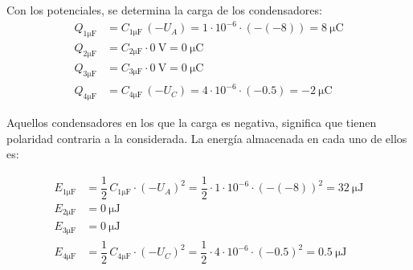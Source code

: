 \vspace{4mm}
Con los potenciales, se determina la carga de los condensadores:
\begin{align*}
  Q_{1\si{\micro\farad}}&=C_{1\si{\micro\farad}}\, (-U_{A}) = 1\cdot 10^{-6}\cdot (-(-8))= \boxed{\qty{8}{\micro\coulomb}}\\
  Q_{2\si{\micro\farad}}&=C_{2\si{\micro\farad}} \cdot \qty{0}{\volt} = \boxed{\qty{0}{\micro\coulomb}}\\
  Q_{3\si{\micro\farad}}&=C_{3\si{\micro\farad}} \cdot \qty{0}{\volt} = \boxed{\qty{0}{\micro\coulomb}}\\
  Q_{4\si{\micro\farad}}&=C_{4\si{\micro\farad}}\, (-U_C) = 4\cdot 10^{-6}\cdot (-0.5)= \boxed{\qty{-2}{\micro\coulomb}}
\end{align*}

\vspace{4mm}
Aquellos condensadores en los que la carga es negativa, significa que tienen polaridad contraria a la considerada. La energía almacenada en cada uno de ellos es:

\begin{align*}
  E_{1\si{\micro\farad}}&=\dfrac{1}{2}\,C_{1\si{\micro\farad}}\cdot (-U_{A})^2 = \dfrac{1}{2}\cdot 1\cdot 10^{-6}\cdot (-(-8))^2= \boxed{\qty{32}{\micro\joule}}\\
  E_{2\si{\micro\farad}}&= \boxed{\qty{0}{\micro\joule}}\\
  E_{3\si{\micro\farad}}&= \boxed{\qty{0}{\micro\joule}}\\
  E_{4\si{\micro\farad}}&=\dfrac{1}{2}\,C_{4\si{\micro\farad}}\cdot (-U_{C})^2 = \dfrac{1}{2}\cdot 4\cdot 10^{-6}\cdot (-0.5)^2= \boxed{\qty{0.5}{\micro\joule}}
\end{align*}

